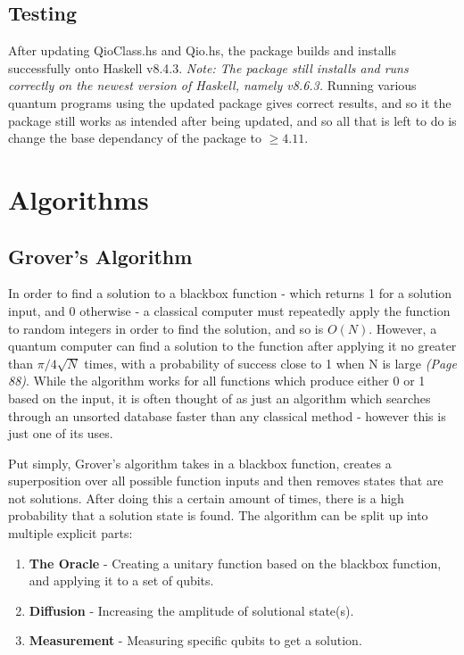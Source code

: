 \documentclass[a4paper,11pt, titlepage, twoside]{article}
\begin{document}
\subsection{Testing}
After updating QioClass.hs and Qio.hs, the package builds and installs successfully onto Haskell v8.4.3. \textit{Note: The package still installs and runs correctly on the newest version of Haskell, namely v8.6.3.} Running various quantum programs using the updated package gives correct results, and so it the package still works as intended after being updated, and so all that is left to do is change the base dependancy of the package to $\geq 4.11$.\clearpage

\section{Algorithms}
\subsection{Grover's Algorithm}
In order to find a solution to a blackbox function - which returns 1 for a solution input, and 0 otherwise - a classical computer must repeatedly apply the function to random integers in order to find the solution, and so is $O(N)$. However, a quantum computer can find a solution to the function after applying it no greater than $\pi/4\sqrt{N}$ times, with a probability of success close to 1 when N is large\cite{qscbook} \textit{(Page 88)}. While the algorithm works for all functions which produce either 0 or 1 based on the input, it is often thought of as just an algorithm which searches through an unsorted database faster than any classical method - however this is just one of its uses. \par
Put simply, Grover's algorithm takes in a blackbox function, creates a superposition over all possible function inputs and then removes states that are not solutions. After doing this a certain amount of times, there is a high probability that a solution state is found. The algorithm can be split up into multiple explicit parts:
\begin{enumerate}
	\item \textbf{The Oracle} -  Creating a unitary function based on the blackbox function, and applying it to a set of qubits.
	\item \textbf{Diffusion} - Increasing the amplitude of solutional state(s).
	\item \textbf{Measurement} - Measuring specific qubits to get a solution.
\end{enumerate}
\par
\end{document}
